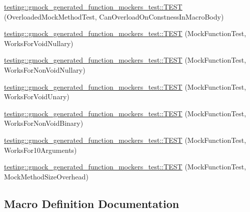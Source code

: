 \begin{DoxyCompactItemize}
\mbox{\hyperlink{namespacetesting_1_1gmock__generated__function__mockers__test_aa58ec93a77bee21244c10da2bc8cf70e}{testing\+::gmock\+\_\+generated\+\_\+function\+\_\+mockers\+\_\+test\+::\+T\+E\+ST}} (Overloaded\+Mock\+Method\+Test, Can\+Overload\+On\+Constness\+In\+Macro\+Body)
\item 
\mbox{\hyperlink{namespacetesting_1_1gmock__generated__function__mockers__test_a8d67aadbc04fee7e2afc10ee91a76b74}{testing\+::gmock\+\_\+generated\+\_\+function\+\_\+mockers\+\_\+test\+::\+T\+E\+ST}} (Mock\+Function\+Test, Works\+For\+Void\+Nullary)
\item 
\mbox{\hyperlink{namespacetesting_1_1gmock__generated__function__mockers__test_a90817999d7f25ecf280453efb157db84}{testing\+::gmock\+\_\+generated\+\_\+function\+\_\+mockers\+\_\+test\+::\+T\+E\+ST}} (Mock\+Function\+Test, Works\+For\+Non\+Void\+Nullary)
\item 
\mbox{\hyperlink{namespacetesting_1_1gmock__generated__function__mockers__test_ab0e1ede6a1f6ef1774e27f5793a33599}{testing\+::gmock\+\_\+generated\+\_\+function\+\_\+mockers\+\_\+test\+::\+T\+E\+ST}} (Mock\+Function\+Test, Works\+For\+Void\+Unary)
\item 
\mbox{\hyperlink{namespacetesting_1_1gmock__generated__function__mockers__test_ab6337da98bc6bc97100ab177386f3b2b}{testing\+::gmock\+\_\+generated\+\_\+function\+\_\+mockers\+\_\+test\+::\+T\+E\+ST}} (Mock\+Function\+Test, Works\+For\+Non\+Void\+Binary)
\item 
\mbox{\hyperlink{namespacetesting_1_1gmock__generated__function__mockers__test_aa92f0b2b98d76f2c881103a19bed7ba6}{testing\+::gmock\+\_\+generated\+\_\+function\+\_\+mockers\+\_\+test\+::\+T\+E\+ST}} (Mock\+Function\+Test, Works\+For10\+Arguments)
\item 
\mbox{\hyperlink{namespacetesting_1_1gmock__generated__function__mockers__test_af89476eb6775c51ca67e398d06c35d43}{testing\+::gmock\+\_\+generated\+\_\+function\+\_\+mockers\+\_\+test\+::\+T\+E\+ST}} (Mock\+Function\+Test, Mock\+Method\+Size\+Overhead)
\end{DoxyCompactItemize}


\subsection{Macro Definition Documentation}
\mbox{\label{gmock-generated-function-mockers__test_8cc_af5ea000ce48c75251a5542898a872339}} 
